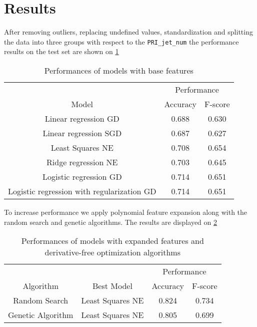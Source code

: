 \documentclass[10pt,conference,compsocconf]{IEEEtran}
\begin{document}
\section{Results}

After removing outliers, replacing undefined values, standardization and splitting the data into three groups with respect to the \texttt{PRI\_jet\_num} the performance results on the test set are shown on \ref{tab:pre-hypopt-results}

\begin{table}[htbp]
  \centering
    \begin{tabular}{|*{3}{c|}}
    \hline
    & \multicolumn{2}{|c|}{Performance} \\
    \cline{2-3}
    Model & Accuracy & F-score\\ \hline
    Linear regression GD &  0.688 & 0.630 \\ \hline
    Linear regression SGD & 0.687 & 0.627\\ \hline
    Least Squares NE& 0.708 & 0.654\\ \hline
    Ridge regression NE& 0.703 & 0.645 \\ \hline
    Logistic regression GD & 0.714 & 0.651 \\ \hline
    Logistic regression with regularization GD & 0.714 & 0.651 \\ \hline
    \end{tabular}
  \caption{Performances of models with base features}
  
  \label{tab:pre-hypopt-results}
\end{table}

To increase performance we apply polynomial feature expansion along with the random search and genetic algorithms. The results are displayed on  \ref{tab:hypopt-results} 

\begin{table}[htbp]
  \centering
    \begin{tabular}{|*{4}{c|}}
    \hline
    & & \multicolumn{2}{|c|}{Performance} \\
    \cline{3-4}
    Algorithm & Best Model & Accuracy & F-score\\ \hline
    Random Search & Least Squares NE  & 0.824 & 0.734 \\ \hline
    Genetic Algorithm & Least Squares NE & 0.805 & 0.699 \\ \hline
    \end{tabular}
  \caption{Performances of models with expanded features and derivative-free optimization algorithms}
  
  \label{tab:hypopt-results}
\end{table}
\end{document}
